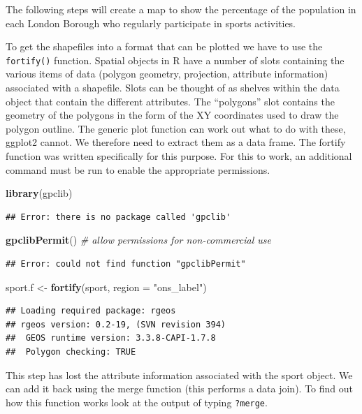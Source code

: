 \documentclass[]{article}
\newenvironment{Shaded}{}{}
\newcommand{\KeywordTok}[1]{\textcolor[rgb]{0.00,0.44,0.13}{\textbf{{#1}}}}
\newcommand{\DataTypeTok}[1]{\textcolor[rgb]{0.56,0.13,0.00}{{#1}}}
\newcommand{\StringTok}[1]{\textcolor[rgb]{0.25,0.44,0.63}{{#1}}}
\newcommand{\CommentTok}[1]{\textcolor[rgb]{0.38,0.63,0.69}{\textit{{#1}}}}
\newcommand{\NormalTok}[1]{{#1}}
\begin{document}
The following steps will create a map to show the percentage of the
population in each London Borough who regularly participate in sports
activities.

To get the shapefiles into a format that can be plotted we have to use
the \texttt{fortify()} function. Spatial objects in R have a number of
slots containing the various items of data (polygon geometry,
projection, attribute information) associated with a shapefile. Slots
can be thought of as shelves within the data object that contain the
different attributes. The ``polygons'' slot contains the geometry of the
polygons in the form of the XY coordinates used to draw the polygon
outline. The generic plot function can work out what to do with these,
ggplot2 cannot. We therefore need to extract them as a data frame. The
fortify function was written specifically for this purpose. For this to
work, an additional command must be run to enable the appropriate
permissions.

\begin{Shaded}
\begin{Highlighting}[]
\KeywordTok{library}\NormalTok{(gpclib)}
\end{Highlighting}
\end{Shaded}
\begin{verbatim}
## Error: there is no package called 'gpclib'
\end{verbatim}
\begin{Shaded}
\begin{Highlighting}[]
\KeywordTok{gpclibPermit}\NormalTok{()  }\CommentTok{# allow permissions for non-commercial use}
\end{Highlighting}
\end{Shaded}
\begin{verbatim}
## Error: could not find function "gpclibPermit"
\end{verbatim}
\begin{Shaded}
\begin{Highlighting}[]
\NormalTok{sport.f <- }\KeywordTok{fortify}\NormalTok{(sport, }\DataTypeTok{region =} \StringTok{"ons_label"}\NormalTok{)}
\end{Highlighting}
\end{Shaded}
\begin{verbatim}
## Loading required package: rgeos
## rgeos version: 0.2-19, (SVN revision 394)
##  GEOS runtime version: 3.3.8-CAPI-1.7.8 
##  Polygon checking: TRUE
\end{verbatim}
This step has lost the attribute information associated with the sport
object. We can add it back using the merge function (this performs a
data join). To find out how this function works look at the output of
typing \texttt{?merge}.
\end{document}
